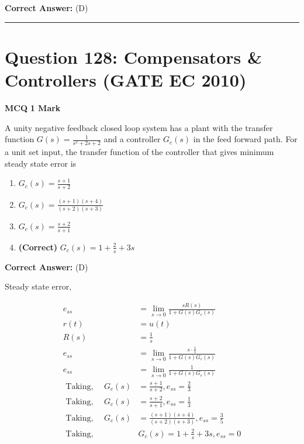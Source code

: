 \documentclass[11pt,a4paper]{article}
\begin{document}
\noindent \textbf{Correct Answer:} (D)


\vspace{1.5em}
\hrule
\vspace{1.5em}

\section*{Question 128: Compensators \& Controllers (GATE EC 2010)}
\noindent \textbf{\color{primary}MCQ} \hfill \textbf{\color{secondary}1 Mark}


\noindent A unity negative feedback closed loop system has a plant with the transfer function $G(s)=\frac{1}{s^{2}+2s+2}$ and a controller $G_{c}(s)$ in the
feed forward path. For a unit set input, the transfer function of the controller that
gives minimum steady state error is


\begin{enumerate}[label=(\Alph*)]
    \item $G_{c}(s)=\frac{s+1}{s+2}$
    \item $G_{c}(s)=\frac{(s+1)(s+4)}{(s+2)(s+3)}$
    \item $G_{c}(s)=\frac{s+2}{s+1}$
    \item \textbf{(Correct)} $G_{c}(s)=1+\frac{2}{s}+3s$
\end{enumerate}

\noindent \textbf{Correct Answer:} (D)

\begin{tcolorbox}[solbox, title=Detailed Solution -- Question 128]
Steady state error,

\[
\begin{aligned} e_{s s} &=\lim _{s \rightarrow 0} \frac{s R(s)}{1+G(s) G_{c}(s)} \\ r(t) &=u(t) \\ R(s) &=\frac{1}{s} \\ e_{ss} &=\lim _{s \rightarrow 0} \frac{s \cdot \frac{1}{s}}{1+G(s) G_{c}(s)} \\ e_{ss}&=\lim _{s \rightarrow 0} \frac{1}{1+G(s) G_{c}(s)} \\ \text { Taking, } \quad G_{c}(s) &=\frac{s+1}{s+2}, e_{s s}=\frac{2}{3} \\ \text { Taking, } \quad G_{c}(s) &=\frac{s+2}{s+1}, e_{s s}=\frac{1}{3} \\ \text { Taking, } \quad G_{c}(s) &=\frac{(s+1)(s+4)}{(s+2)(s+3)}, e_{s s}=\frac{3}{5} \\ \text { Taking, } \quad & G_{c}(s)=1+\frac{2}{s}+3 s, e_{s s}=0 \end{aligned}
\]
\end{tcolorbox}
\end{document}
